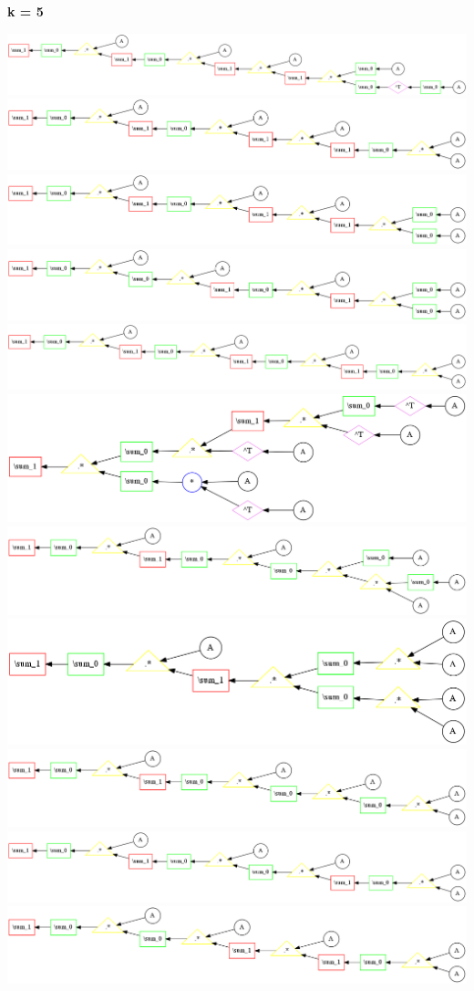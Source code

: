 {\bf k = 5}


\begin{center}
\includegraphics[width=0.45\linewidth]{trees/RBM_5_horizontal_0.png}
\includegraphics[width=0.45\linewidth]{trees/RBM_5_horizontal_1.png}
\includegraphics[width=0.45\linewidth]{trees/RBM_5_horizontal_2.png}
\includegraphics[width=0.45\linewidth]{trees/RBM_5_horizontal_3.png}
\includegraphics[width=0.45\linewidth]{trees/RBM_5_horizontal_4.png}
\includegraphics[width=0.45\linewidth]{trees/RBM_5_horizontal_5.png}
\includegraphics[width=0.45\linewidth]{trees/RBM_5_horizontal_6.png}
\includegraphics[width=0.45\linewidth]{trees/RBM_5_horizontal_7.png}
\includegraphics[width=0.45\linewidth]{trees/RBM_5_horizontal_8.png}
\includegraphics[width=0.45\linewidth]{trees/RBM_5_horizontal_9.png}
\includegraphics[width=0.45\linewidth]{trees/RBM_5_horizontal_10.png}

\end{center}
